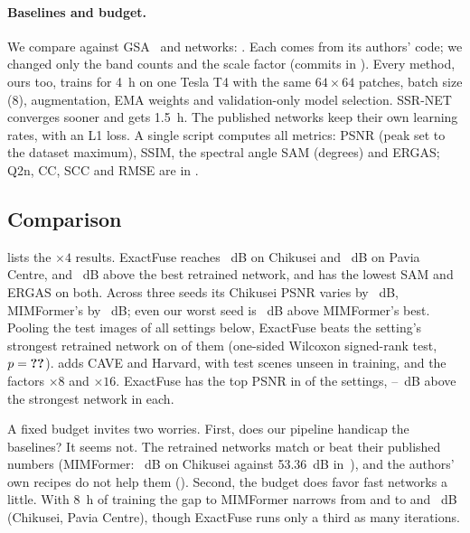 \documentclass[10pt,twocolumn,letterpaper]{article}
\begin{document}
\paragraph{Baselines and budget.} We compare against GSA~\cite{aiazzi2007gsa} and  networks: . Each comes from its authors' code; we changed only the band counts and the scale factor (commits in \supp). Every method, ours too, trains for 4~h on one Tesla T4 with the same $64\times64$ patches, batch size (8), augmentation, EMA weights and validation-only model selection. SSR-NET converges sooner and gets 1.5~h. The published networks keep their own learning rates, with an L1 loss. A single script computes all metrics: PSNR (peak set to the dataset maximum), SSIM, the spectral angle SAM (degrees) and ERGAS; Q2n, CC, SCC and RMSE are in \supp.

\subsection{Comparison}
\label{sec:bench}

 lists the $\times4$ results. ExactFuse reaches ~dB on Chikusei and ~dB on Pavia Centre,  and ~dB above the best retrained network, and has the lowest SAM and ERGAS on both. Across three seeds its Chikusei PSNR varies by ~dB, MIMFormer's by ~dB; even our worst seed is ~dB above MIMFormer's best. Pooling the  test images of all  settings below, ExactFuse beats the setting's strongest retrained network on  of them (one-sided Wilcoxon signed-rank test, $p=\qone{pooled-p}$).  adds CAVE and Harvard, with test scenes unseen in training, and the factors $\times8$ and $\times16$. ExactFuse has the top PSNR in  of the  settings, --~dB above the strongest network in each.


A fixed budget invites two worries. First, does our pipeline handicap the baselines? It seems not. The retrained networks match or beat their published numbers (MIMFormer: ~dB on Chikusei against 53.36~dB in~\cite{chen2026twostage}), and the authors' own recipes do not help them (\supp). Second, the budget does favor fast networks a little. With 8~h of training the gap to MIMFormer narrows from  and  to  and ~dB (Chikusei, Pavia Centre), though ExactFuse runs only a third as many iterations.
\end{document}
